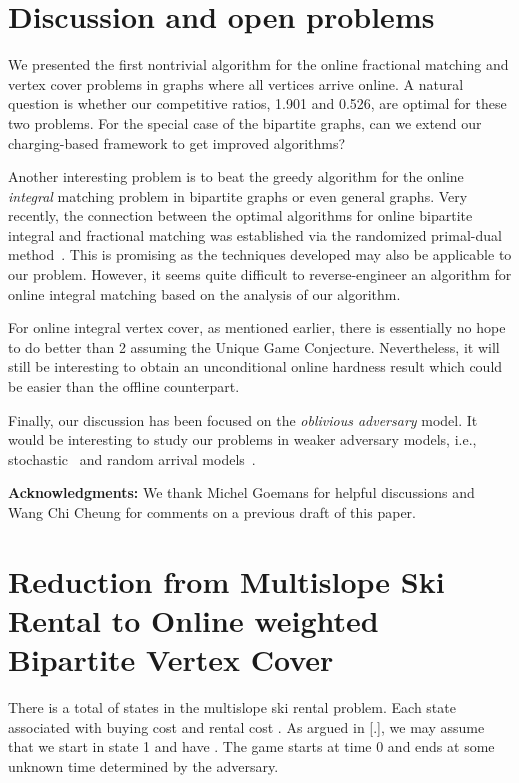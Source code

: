 \documentclass{article}
\begin{document}
\section{Discussion and open problems}


We presented the first nontrivial algorithm for the online fractional matching and vertex cover problems in graphs where all vertices arrive online. A natural question is whether our competitive ratios, 1.901 and 0.526, are optimal for these two problems. For the special case of the bipartite graphs, can we extend our charging-based framework to get improved algorithms?

Another interesting problem is to beat the greedy algorithm for the online {\em integral} matching problem in bipartite graphs or even general graphs. Very recently, the connection between the optimal algorithms for online bipartite integral and fractional matching was established via the randomized primal-dual method~\cite{devanurrandomized}. This is promising as the techniques developed may also be applicable to our problem. However, it seems quite difficult to reverse-engineer an algorithm for online integral matching based on the analysis of our algorithm.


For online integral vertex cover, as mentioned earlier, there is essentially no hope to do better than 2 assuming the Unique Game Conjecture. Nevertheless, it will still be interesting to obtain an unconditional online hardness result which could be easier than the offline counterpart.

Finally, our discussion has been focused on the {\em oblivious adversary} model. It would be interesting to study our problems in weaker adversary models, i.e., stochastic~\cite{Feldman2009,Manshadi2011} and random arrival models~\cite{Mahdian2011,Karande2011}.


{\noindent \bf Acknowledgments:}  We thank Michel Goemans for helpful discussions and Wang Chi Cheung for comments on a previous draft of this paper.




\clearpage{}\appendix

\section{Reduction from Multislope Ski Rental to Online weighted Bipartite Vertex Cover}
\label{sec:multislope}
There is a total of  states  in the multislope ski rental problem. Each state  associated with buying cost  and rental cost . As argued in [.], we may assume that we start in state 1 and have . The game starts at time 0 and ends at some unknown time  determined by the adversary.
\end{document}
